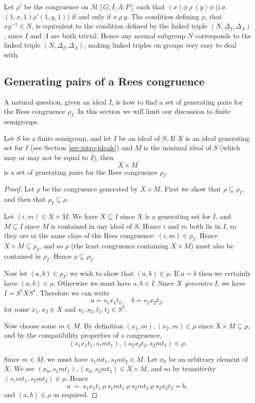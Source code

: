 Let $\rho'$ be the congruence on $\mathcal{M}[G; I, \Lambda; P]$ such that
$(x)\phi ~\rho~ (y)\phi$ (i.e.~$(1,x,1) \mathrel{\rho'} (1,y,1)$) if and only if
$x ~\rho~ y$.  The condition defining $\rho$, that $xy^{-1} \in N$, is
equivalent to the condition defined by the linked triple
$(N, \Delta_I, \Delta_\Lambda)$, since $I$ and $\Lambda$ are both trivial.
Hence any normal subgroup $N$ corresponds to the linked triple
$(N, \Delta_I, \Delta_\Lambda)$, making linked triples on groups very easy to
deal with.

\subsection{Generating pairs of a Rees congruence}
\label{sec:rees-to-pairs}
A natural question, given an ideal $I$, is how to find a set of generating pairs
for the Rees congruence $\rho_I$.  In this section we will limit our discussion
to finite semigroups.

\begin{theorem}
  Let $S$ be a finite semigroup, and let $I$ be an ideal of $S$.  If $X$ is an ideal
  generating set for $I$ (see Section \ref{sec:intro-ideals}) and $M$
  is the minimal ideal of $S$ (which may or may not be equal to $I$), then
  $$X \times M$$ is a set of generating pairs for the Rees congruence $\rho_I$.
  \begin{proof}
    Let $\rho$ be the congruence generated by $X \times M$.  First we show that
    $\rho \subseteq \rho_I$, and then that $\rho_I \subseteq \rho$.

    Let $(i,m) \in X \times M$.  We have $X \subseteq I$ since $X$ is a
    generating set for $I$, and $M \subseteq I$ since $M$ is contained in any
    ideal of $S$.  Hence $i$ and $m$ both lie in $I$, so they are in the same
    class of the Rees congruence: $(i,m) \in \rho_I$.  Hence $X \times M
    \subseteq \rho_I$, and so $\rho$ (the least congruence containing $X \times
    M$) must also be contained in $\rho_I$.  Hence $\rho \subseteq \rho_I$.

    Now let $(a,b) \in \rho_I$; we wish to show that $(a,b) \in \rho$.  If $a=b$
    then we certainly have $(a,b) \in \rho$.  Otherwise we must have $a,b \in
    I$.  Since $X$ \textit{generates} $I$, we have $I = S^1XS^1$.  Therefore we
    can write
    $$a = s_1x_1t_1, \quad b = s_2x_2t_2,$$
    for some $x_1,x_2 \in X$ and $s_1,s_2,t_1,t_2 \in S^1$.

    Now choose some $m \in M$.  By definition $(x_1,m), (x_2,m) \in \rho$ since
    $X \times M \subseteq \rho$, and
    by the compatibility properties of a congruence,
    $$(s_1x_1t_1,s_1mt_1), (s_2x_2t_2,s_2mt_2) \in \rho.$$

    Since $m \in M$, we must have $s_1mt_1,s_2mt_2 \in M$.  Let $x_0$ be an
    arbitrary element of $X$.
    We see $(x_0,s_1mt_1), (x_0,s_2mt_2) \in X \times M$, and so by transitivity
    $(s_1mt_1, s_2mt_2) \in \rho$.
    Hence
    $$a ~=~ s_1x_1t_1 ~\rho~ s_1mt_1 ~\rho~ s_2mt_2 ~\rho~ s_2x_2t_2 = b,$$
    and $(a,b) \in \rho$ as required.
  \end{proof}
\end{theorem}

